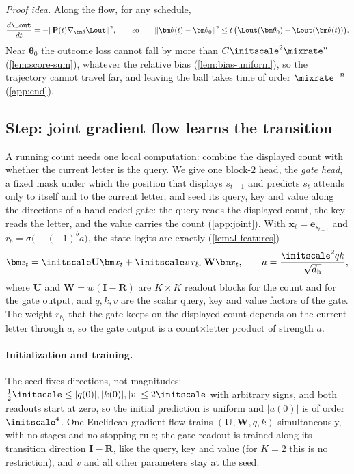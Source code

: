 \emph{Proof idea.} Along the flow, for any schedule,
\[
 \frac{d\Lout}{dt}=-\|\mathbf P(t)\nabla_{\bm\theta}\Lout\|^2,
 \qquad\text{so}\qquad
 \|\bm\theta(t)-\bm\theta_0\|^2\le t\,\bigl(\Lout(\bm\theta_0)-\Lout(\bm\theta(t))\bigr).
\]
Near $\bm\theta_0$ the outcome loss cannot fall by more than $C\initscale^2\mixrate^n$ (\cref{lem:score-sum}), whatever the relative bias
(\cref{lem:bias-uniform}), so the trajectory cannot travel far, and leaving the ball takes time of order $\mixrate^{-n}$ (\cref{app:end}).

\subsection{Step: joint gradient flow learns the transition}
\label{sec:step}
A running count needs one local computation: combine the displayed count with whether the current letter is the query.
We give one block-$2$ head, the \emph{gate head}, a fixed mask under which the position that displays $s_{t-1}$ and predicts $s_t$
attends only to itself and to the current letter, and seed its query, key and value along the directions of a hand-coded gate: the
query reads the displayed count, the key reads the letter, and the value carries the count (\cref{app:joint}). With
$\bm x_t=\bm e_{s_{t-1}}$ and $r_b=\sigma\bigl(-(-1)^ba\bigr)$, the state logits are exactly (\cref{lem:J-features})
\[
 \bm z_t=\initscale \mathbf U\bm x_t+\initscale v\,r_{b_t}\,\mathbf W\bm x_t,
 \qquad a=\frac{\initscale^2qk}{\sqrt{d_{\mathrm h}}},
\]
where $\mathbf U$ and $\mathbf W=w(\mathbf I-\mathbf R)$ are $K\times K$ readout blocks for the count and for the gate output, and $q,k,v$ are the scalar query, key and
value factors of the gate. The weight $r_{b_t}$ that the gate keeps on the displayed count depends on the current letter through
$a$, so the gate output is a count$\times$letter product of strength $a$.

\paragraph{Initialization and training.} The seed fixes directions, not magnitudes: $\tfrac{1}{2}\initscale\le|q(0)|,|k(0)|,|v|\le2\initscale$ with arbitrary
signs, and both readouts start at zero, so the initial prediction is
uniform and $|a(0)|$ is of order $\initscale^4$. One Euclidean gradient flow trains $(\mathbf U,\mathbf W,q,k)$ simultaneously, with no stages and no
stopping rule; the gate readout is trained along its transition direction $\mathbf I-\mathbf R$, like the query, key and value (for $K=2$ this is
no restriction), and $v$ and all other parameters stay at the seed.

